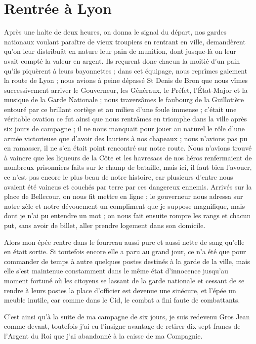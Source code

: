 \documentclass[11pt,a4paper]{report}
\begin{document}
\section*{Rentrée à Lyon}

Après une halte de deux heures, on donna le signal du départ, nos gardes nationaux voulant paraître de vieux troupiers en rentrant en ville, demandèrent qu'on leur distribuât en nature leur pain de munition, dont jusque-là on leur avait compté la valeur en argent. Ils reçurent donc chacun la moitié d'un pain qu'ils piquèrent à leurs bayonnettes ; dans cet équipage, nous reprîmes gaiement la route de Lyon ; nous avions à peine dépassé St Denis de Bron que nous vîmes successivement arriver le Gouverneur, les Généraux, le Préfet, l'État-Major et la musique de la Garde Nationale ; nous traversâmes le faubourg de la Guillotière entouré par ce brillant cortège et au milieu d'une foule immense ; c'était une véritable ovation ce fut ainsi que nous rentrâmes en triomphe dans la ville après six jours de campagne ; il ne nous manquait pour jouer au naturel le rôle d'une armée victorieuse que d'avoir des lauriers à nos chapeaux ; nous n'avions pas pu en ramasser, il ne s'en était point rencontré sur notre route. Nous n'avions trouvé à vaincre que les liqueurs de la Côte et les havresacs de nos héros renfermaient de nombreux prisonniers faits sur le champ de bataille, mais ici, il faut bien l'avouer, ce n'est pas encore le plus beau de notre histoire, car plusieurs d'entre nous avaient été vaincus et couchés par terre par ces dangereux ennemis. Arrivés sur la place de Bellecour, on nous fit mettre en ligne ; le gouverneur nous adressa sur notre zèle et notre dévouement un compliment que je suppose magnifique, mais dont je n'ai pu entendre un mot ; on nous fait ensuite rompre les rangs et chacun put, sans avoir de billet, aller prendre logement dans son domicile.

Alors mon épée rentre dans le fourreau aussi pure et aussi nette de sang qu'elle en était sortie. Si toutefois encore elle a paru au grand jour, ce n'a été que pour commander de temps à autre quelques postes destinés à la garde de la ville, mais elle s'est maintenue constamment dans le même état d'innocence jusqu'au moment fortuné où les citoyens se lassant de la garde nationale et cessant de se rendre à leurs postes la place d'officier est devenue une sinécure, et l'épée un meuble inutile, car comme dans le Cid, le combat a fini faute de combattants.

C'est ainsi qu'à la suite de ma campagne de six jours, je suis redevenu Gros Jean comme devant, toutefois j'ai eu l'insigne avantage de retirer dix-sept francs de l'Argent du Roi que j'ai abandonné à la caisse de ma Compagnie.
\end{document}
